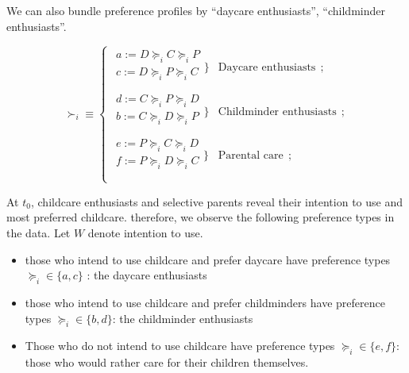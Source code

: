 \documentclass[
]{article}
\providecommand{\tightlist}{%
  \setlength{\itemsep}{0pt}\setlength{\parskip}{0pt}}
\begin{document}
We can also bundle preference profiles by ``daycare enthusiasts'', ``childminder enthusiasts''.

\begin{equation}
    \succ_i \equiv 
      \left\{ 
          \begin{aligned}
            \left. 
              \begin{matrix}
                a:=D\succeq_iC\succeq_iP    \\
                c:=D\succeq_iP\succeq_iC\\
              \end{matrix} 
            \} \right. & 
                \text{Daycare enthusiasts} ~~;    \\
            \left. 
              \begin{matrix}
                d:=C\succeq_iP\succeq_iD\\
                b:=C\succeq_iD\succeq_iP    \\
              \end{matrix}
            \} \right. & 
                  \text{Childminder enthusiasts} ~~;    \\
            \left. 
              \begin{matrix}
                e:=P\succeq_iC\succeq_iD\\
                f:=P\succeq_iD\succeq_iC\\
              \end{matrix} 
            \}\right. & 
                  \text{Parental care} ~~;  \\
          \end{aligned} 
    \right.
\end{equation}

At \(t_0\), childcare enthusiasts and selective parents reveal their intention to use and most preferred childcare. therefore, we observe the following preference types in the data. Let \(W\) denote intention to use.

\begin{itemize}
\tightlist
\item
  those who intend to use childcare and prefer daycare have preference types \(\succeq_i\in\{a,c\}\) : the daycare enthusiasts
\item
  those who intend to use childcare and prefer childminders have preference types \(\succeq_i\in\{b,d\}\): the childminder enthusiasts
\item
  Those who do not intend to use childcare have preference types \(\succeq_i\in\{e,f\}\): those who would rather care for their children themselves.
\end{itemize}
\end{document}
